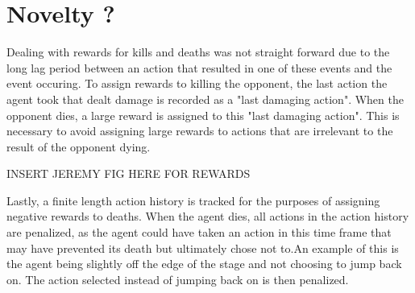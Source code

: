 \section{Novelty ? }


Dealing with rewards for kills and deaths was not straight forward due to the long lag period between an action that resulted in one of these events and the event occuring. To assign rewards to killing the opponent, the last action the agent took that dealt damage is recorded as a "last damaging action". When the opponent dies, a large reward is assigned to this "last damaging action". This is necessary to avoid assigning large rewards to actions that are irrelevant to the result of the opponent dying.

INSERT JEREMY FIG HERE FOR REWARDS

Lastly, a finite length action history is tracked for the purposes of assigning negative rewards to deaths. When the agent dies, all actions in the action history are penalized, as the agent could have taken an action in this time frame that may have prevented its death but ultimately chose not to.An example of this is the agent being slightly off the edge of the stage and not choosing to jump back on. The action selected instead of jumping back on is then penalized.


